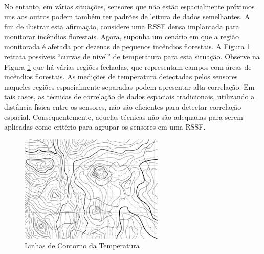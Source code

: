 \documentclass{acm_proc_article-sp}
\begin{document}
No entanto, em várias situações, sensores que não estão espacialmente próximos
uns aos outros podem também ter padrões de leitura de dados semelhantes.
A fim de ilustrar esta afirmação, considere uma RSSF densa implantada para
monitorar incêndios florestais. Agora, suponha um cenário em que a região
monitorada é afetada por dezenas de pequenos incêndios florestais.
A Figura \ref{fig:contour_lines} retrata possíveis ``curvas de nível'' de
temperatura para esta situação. Observe na Figura \ref{fig:contour_lines} que há
várias regiões fechadas, que representam campos com áreas de incêndios
florestais. As medições de temperatura detectadas pelos sensores naqueles
regiões espacialmente separadas podem apresentar alta correlação.
Em tais casos, as técnicas de correlação de dados espaciais tradicionais,
utilizando a distância física entre os sensores, não são eficientes para
detectar correlação espacial. Consequentemente, aquelas técnicas não são
adequadas para serem aplicadas como critério para agrupar os sensores em uma
RSSF.

\begin{figure}[!htb]
\centering
	\includegraphics[scale=0.8]{I2.png}
    \caption{Linhas de Contorno da Temperatura}
    \label{fig:contour_lines}
\end{figure}
\vspace*{-.3cm}
\end{document}
